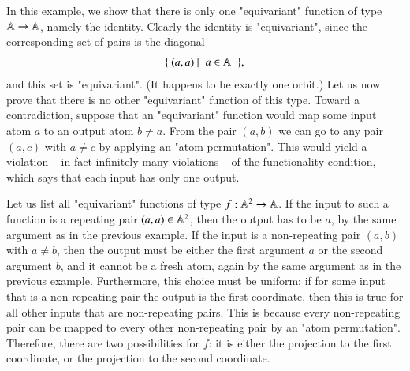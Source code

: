 \begin{myexample} In this example, we show that there is only one "equivariant" function of type $\mathbb A \to \mathbb A$, namely the identity. Clearly the identity is "equivariant", since the corresponding set of pairs is the diagonal 
    \begin{align*}
    \setbuild{(a,a)}{$a \in \atoms$},
    \end{align*}
    and this set is "equivariant". (It happens to be exactly one orbit.) Let us now prove that there is no other "equivariant" function of this type. Toward a contradiction,  suppose  that an "equivariant" function would map some input atom $a$ to an output atom $b \neq a$. From the pair $(a,b)$ we can go to any pair $(a,c)$ with $a \neq c$ by applying an "atom permutation". This would yield a violation -- in fact infinitely many violations -- of the functionality condition, which says that each input has only one output. 
\end{myexample}
\begin{myexample}
    \label{ex:equivariant-functions-of-type-atoms2-to-atoms}
    Let us list all "equivariant" functions of type $f : \mathbb A^2 \to \mathbb A$.  
    If the input to such a function is a repeating pair $(a,a) \in \mathbb A^2$, then the output has to be $a$, by the same argument as in the previous example. If the input is a non-repeating pair $(a,b)$ with $a \neq b$, then the output must be either the first argument $a$ or the second argument $b$, and it cannot be a fresh atom, again by the same argument as in the previous example. Furthermore, this choice must be uniform: if for some input that is a  non-repeating pair the output is the first coordinate, then this is true for all other inputs that are non-repeating pairs. This is because every non-repeating pair can be mapped to every other non-repeating pair by an "atom permutation". Therefore, there are two possibilities for $f$: it is either the projection to the first coordinate, or the projection to the second coordinate.
\end{myexample}

